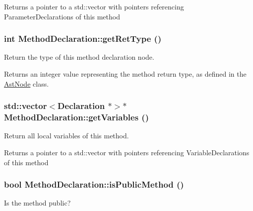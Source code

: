 \begin{DoxyReturn}{Returns}
a pointer to a std::vector with pointers referencing ParameterDeclarations of this method 
\end{DoxyReturn}
\hypertarget{classMethodDeclaration_ab26bfa7db28f171f2a25dacefd5141bf}{
\subsubsection[{getRetType}]{\setlength{\rightskip}{0pt plus 5cm}int MethodDeclaration::getRetType ()}}
\label{classMethodDeclaration_ab26bfa7db28f171f2a25dacefd5141bf}
Return the type of this method declaration node.

\begin{DoxyReturn}{Returns}
an integer value representing the method return type, as defined in the \hyperlink{classAstNode}{AstNode} class. 
\end{DoxyReturn}
\hypertarget{classMethodDeclaration_a4078ee50432bfa957007584cf6f3f260}{
\subsubsection[{getVariables}]{\setlength{\rightskip}{0pt plus 5cm}std::vector$<${\bf Declaration} $\ast$$>$$\ast$ MethodDeclaration::getVariables ()}}
\label{classMethodDeclaration_a4078ee50432bfa957007584cf6f3f260}
Return all local variables of this method.

\begin{DoxyReturn}{Returns}
a pointer to a std::vector with pointers referencing VariableDeclarations of this method 
\end{DoxyReturn}
\hypertarget{classMethodDeclaration_ac857d555077d6b35696470fd33f9315c}{
\subsubsection[{isPublicMethod}]{\setlength{\rightskip}{0pt plus 5cm}bool MethodDeclaration::isPublicMethod ()}}
\label{classMethodDeclaration_ac857d555077d6b35696470fd33f9315c}
Is the method public?

